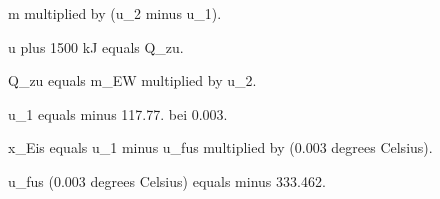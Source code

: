 m multiplied by (u_2 minus u_1).  

u plus 1500 kJ equals Q_zu.  

Q_zu equals m_EW multiplied by u_2.  

u_1 equals minus 117.77.  
bei 0.003.  

x_Eis equals u_1 minus u_fus multiplied by (0.003 degrees Celsius).  

u_fus (0.003 degrees Celsius) equals minus 333.462.
